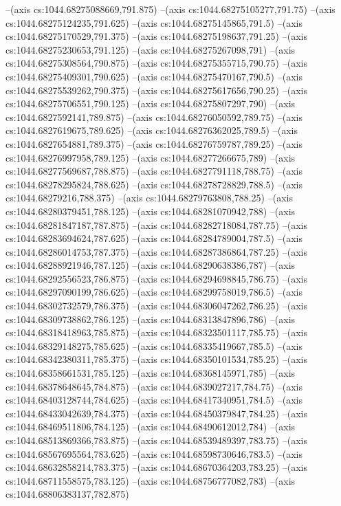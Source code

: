 --(axis cs:1044.68275088669,791.875)
--(axis cs:1044.68275105277,791.75)
--(axis cs:1044.68275124235,791.625)
--(axis cs:1044.68275145865,791.5)
--(axis cs:1044.68275170529,791.375)
--(axis cs:1044.68275198637,791.25)
--(axis cs:1044.68275230653,791.125)
--(axis cs:1044.68275267098,791)
--(axis cs:1044.68275308564,790.875)
--(axis cs:1044.68275355715,790.75)
--(axis cs:1044.68275409301,790.625)
--(axis cs:1044.68275470167,790.5)
--(axis cs:1044.68275539262,790.375)
--(axis cs:1044.68275617656,790.25)
--(axis cs:1044.68275706551,790.125)
--(axis cs:1044.68275807297,790)
--(axis cs:1044.6827592141,789.875)
--(axis cs:1044.68276050592,789.75)
--(axis cs:1044.6827619675,789.625)
--(axis cs:1044.68276362025,789.5)
--(axis cs:1044.6827654881,789.375)
--(axis cs:1044.68276759787,789.25)
--(axis cs:1044.68276997958,789.125)
--(axis cs:1044.68277266675,789)
--(axis cs:1044.68277569687,788.875)
--(axis cs:1044.6827791118,788.75)
--(axis cs:1044.68278295824,788.625)
--(axis cs:1044.68278728829,788.5)
--(axis cs:1044.68279216,788.375)
--(axis cs:1044.68279763808,788.25)
--(axis cs:1044.68280379451,788.125)
--(axis cs:1044.68281070942,788)
--(axis cs:1044.68281847187,787.875)
--(axis cs:1044.68282718084,787.75)
--(axis cs:1044.68283694624,787.625)
--(axis cs:1044.68284789004,787.5)
--(axis cs:1044.68286014753,787.375)
--(axis cs:1044.68287386864,787.25)
--(axis cs:1044.68288921946,787.125)
--(axis cs:1044.68290638386,787)
--(axis cs:1044.68292556523,786.875)
--(axis cs:1044.68294698845,786.75)
--(axis cs:1044.68297090199,786.625)
--(axis cs:1044.68299758019,786.5)
--(axis cs:1044.68302732579,786.375)
--(axis cs:1044.68306047262,786.25)
--(axis cs:1044.68309738862,786.125)
--(axis cs:1044.68313847896,786)
--(axis cs:1044.68318418963,785.875)
--(axis cs:1044.68323501117,785.75)
--(axis cs:1044.68329148275,785.625)
--(axis cs:1044.68335419667,785.5)
--(axis cs:1044.68342380311,785.375)
--(axis cs:1044.68350101534,785.25)
--(axis cs:1044.68358661531,785.125)
--(axis cs:1044.68368145971,785)
--(axis cs:1044.68378648645,784.875)
--(axis cs:1044.6839027217,784.75)
--(axis cs:1044.68403128744,784.625)
--(axis cs:1044.68417340951,784.5)
--(axis cs:1044.68433042639,784.375)
--(axis cs:1044.68450379847,784.25)
--(axis cs:1044.68469511806,784.125)
--(axis cs:1044.68490612012,784)
--(axis cs:1044.68513869366,783.875)
--(axis cs:1044.68539489397,783.75)
--(axis cs:1044.68567695564,783.625)
--(axis cs:1044.68598730646,783.5)
--(axis cs:1044.68632858214,783.375)
--(axis cs:1044.68670364203,783.25)
--(axis cs:1044.68711558575,783.125)
--(axis cs:1044.68756777082,783)
--(axis cs:1044.68806383137,782.875)
